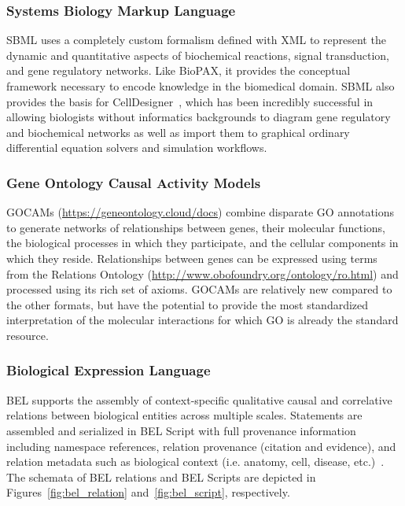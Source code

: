 \subsubsection{Systems Biology Markup Language}

\ac{SBML} uses a completely custom formalism defined with \ac{XML} to represent the dynamic and quantitative aspects of biochemical reactions, signal transduction, and gene regulatory networks\cite{Hucka2003}.
Like \ac{BioPAX}, it provides the conceptual framework necessary to encode knowledge in the biomedical domain.
\ac{SBML} also provides the basis for CellDesigner~\cite{Funahashi2003}, which has been incredibly successful in allowing biologists without informatics backgrounds to diagram gene regulatory and biochemical networks as well as import them to graphical ordinary differential equation solvers and simulation workflows.

\subsubsection{Gene Ontology Causal Activity Models}

\acp{GOCAM} (\url{https://geneontology.cloud/docs}) combine disparate \ac{GO} annotations to generate networks of relationships between genes, their molecular functions, the biological processes in which they participate, and the cellular components in which they reside.
Relationships between genes can be expressed using terms from the Relations Ontology (\url{http://www.obofoundry.org/ontology/ro.html}) and processed using its rich set of axioms.
\acp{GOCAM} are relatively new compared to the other formats, but have the potential to provide the most standardized interpretation of the molecular interactions for which \ac{GO} is already the standard resource.

\subsubsection{Biological Expression Language}

\ac{BEL} supports the assembly of context-specific qualitative causal and correlative relations between biological entities across multiple scales.
Statements are assembled and serialized in \ac{BEL} Script with full provenance information including namespace references, relation provenance (citation and evidence), and relation metadata such as biological context (i.e. anatomy, cell, disease, etc.)~\cite{Slater2014}.
The schemata of BEL relations and BEL Scripts are depicted in Figures~\ref{fig:bel_relation} and~\ref{fig:bel_script}, respectively.

